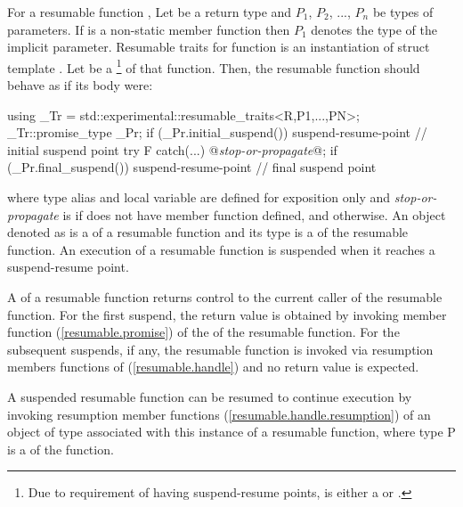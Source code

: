 \pnum
For a resumable function , Let  be a return type and $P_1$, $P_2$, ..., $P_n$
be types of parameters. If  is a non-static member function then $P_1$ denotes the type of the implicit  parameter. 
Resumable traits for function  is an instantiation of
struct template .
Let  be a 
\footnote{
Due to requirement of having suspend-resume points,
 is either a
 or 
.
}
of that function. Then, the resumable function 
should behave as if its body were:
\begin{codeblock}
  {
     using _Tr = std::experimental::resumable_traits<R,P1,...,PN>;
     _Tr::promise_type _Pr;
     if (_Pr.initial_suspend()) {
       suspend-resume-point // initial suspend point
     }
     try { F }
     catch(...) {
       @\textit{stop-or-propagate}@;
     }
     if (_Pr.final_suspend()) {
       suspend-resume-point // final suspend point
     }
  }
\end{codeblock}
where type alias  and local variable  are 
defined for
exposition only and
\textit{stop-or-propagate} is  
if  does not have  member function defined, and  otherwise. An object denoted as  is a  of
a resumable function and its type is a 
of the resumable function.
An execution of a resumable function is suspended when it reaches a suspend-resume point.

\pnum 
A  of a resumable function returns control to the current
caller of the resumable function. For the first suspend, the return value is obtained by invoking member function 
 (\ref{resumable.promise})
of the  of the resumable function.
For the subsequent suspends, if any, the resumable function
is invoked via resumption members functions of
 (\ref{resumable.handle}) and no return value is expected.

\pnum
A suspended resumable function can be resumed
to continue execution by invoking
resumption member functions (\ref{resumable.handle.resumption}) of an object of  type
associated with this instance of a resumable function, where type P
is a  of the function. 


